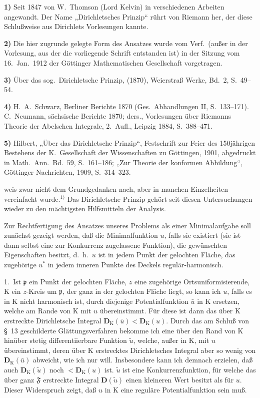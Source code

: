 \documentclass{article}
\begin{document}
\textbf{1)} Seit 1847 von W.~Thomson (Lord Kelvin) in verschiedenen Arbeiten angewandt. Der Name „Dirichletsches Prinzip“ rührt von Riemann her, der diese Schlußweise aus Dirichlets Vorlesungen kannte.

\textbf{2)} Die hier zugrunde gelegte Form des Ansatzes wurde vom Verf.\ (außer in der Vorlesung, aus der die vorliegende Schrift entstanden ist) in der Sitzung vom 16.\ Jan.\ 1912 der Göttinger Mathematischen Gesellschaft vorgetragen.

\textbf{3)} Über das sog.\ Dirichletsche Prinzip, (1870), Weierstraß Werke, Bd.~2, S.~49--54.

\textbf{4)} H.~A.~Schwarz, Berliner Berichte 1870 (Ges.\ Abhandlungen II, S.~133--171). C.~Neumann, sächsische Berichte 1870; ders., Vorlesungen über Riemanns Theorie der Abelschen Integrale, 2.\ Aufl., Leipzig 1884, S.~388--471.

\textbf{5)} Hilbert, „Über das Dirichletsche Prinzip“, Festschrift zur Feier des 150jährigen Bestehens der K.~Gesellschaft der Wissenschaften zu Göttingen, 1901, abgedruckt in Math.\ Ann.\ Bd.~59, S.~161--186; „Zur Theorie der konformen Abbildung“, Göttinger Nachrichten, 1909, S.~314--323.

weis zwar nicht dem Grundgedanken nach, aber in manchen Einzelheiten vereinfacht wurde.${}^{1)}$ Das Dirichletsche Prinzip gehört seit diesen Untersuchungen wieder zu den mächtigsten Hilfsmitteln der Analysis.

Zur Rechtfertigung des Ansatzes unseres Problems als einer Minimalaufgabe soll zunächst gezeigt werden, daß die Minimalfunktion $u$, falls sie existiert (sie ist dann selbst eine zur Konkurrenz zugelassene Funktion), die gewünschten Eigenschaften besitzt, d.~h.\ $u$ ist in jedem Punkt der gelochten Fläche, das zugehörige $u^*$ in jedem inneren Punkte des Deckels regulär-harmonisch.

1.\ Ist $\mathfrak{p}$ ein Punkt der gelochten Fläche, $z$ eine zugehörige Ortsuniformisierende, $\mathrm{K}$ ein $z$-Kreis um $\mathfrak{p}$, der ganz in der gelochten Fläche liegt, so kann ich $u$, falls es in $\mathrm{K}$ nicht harmonisch ist, durch diejenige Potentialfunktion $\bar{u}$ in $\mathrm{K}$ ersetzen, welche am Rande von $\mathrm{K}$ mit $u$ übereinstimmt. Für diese ist dann das über $\mathrm{K}$ erstreckte Dirichletsche Integral $\mathbf{D}_{\mathrm{K}}(\bar{u}) < \mathbf{D}_{\mathrm{K}}(u)$. Durch das am Schluß von §~13 geschilderte Glättungsverfahren bekomme ich eine über den Rand von $\mathrm{K}$ hinüber stetig differentiierbare Funktion $\tilde{u}$, welche, außer in $\mathrm{K}$, mit $u$ übereinstimmt, deren über $\mathrm{K}$ erstrecktes Dirichletsches Integral aber so wenig von $\mathbf{D}_{\mathrm{K}}(\bar{u})$ abweicht, wie ich nur will. Insbesondere kann ich demnach erzielen, daß auch $\mathbf{D}_{\mathrm{K}}(\tilde{u})$ noch $< \mathbf{D}_{\mathrm{K}}(u)$ ist. $\tilde{u}$ ist eine Konkurrenzfunktion, für welche das über ganz $\mathfrak{F}$ erstreckte Integral $\mathbf{D}(\tilde{u})$ einen kleineren Wert besitzt als für $u$. Dieser Widerspruch zeigt, daß $u$ in $\mathrm{K}$ eine reguläre Potentialfunktion sein muß.
\end{document}
